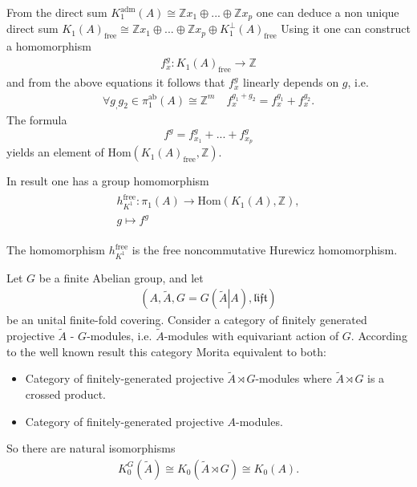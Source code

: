 \documentclass{beamer}
\theoremstyle{plain}
\newcommand{\Z}{\mathbb{Z}}                  %
\newcommand{\lift}{\mathfrak{lift}}
\newcommand{\Hom}{\mathrm{Hom}}
\newcommand{\bean}{\begin{eqnarray*}}
\newcommand{\eean}{\end{eqnarray*}}
\begin{document}
\begin{frame}
	From the direct sum $K^{\mathrm{adm}}_1\left( A\right)\cong \Z x_1 \oplus ...\oplus \Z x_p$ one can deduce  a non unique  direct sum $K_1\left( A\right)_{\mathrm{free}}\cong \Z x_1 \oplus ...\oplus \Z x_p\oplus K^\perp_1\left( A\right)_{\mathrm{free}}$
Using it  one can construct a homomorphism 
\bean
f^g_x: K_1\left( A\right)_{\mathrm{free}}\to\Z
\eean
and from the above equations it follows that $f^g_x$ linearly depends on $g$, i.e.
\bean
\forall g_, g_2\in \pi^{\mathrm{ab}}_1\left( A\right)\cong \Z^m\quad f^{g_1 + g_2}_x =  f^{g_1}_x+f^{g_2}_x.
\eean 
The formula
$$
f^g = f^g_{x_1} + ... + f^g_{x_p}
$$
yields an element of $\Hom\left(K_1\left( A\right)_{\mathrm{free}}, \Z \right)$.


\end{frame}
\begin{frame}
	In result one has a group homomorphism
	\bean
	\begin{split}
		h^{\mathrm{free}}_{K^1} : \pi_1\left(A \right) \to  \Hom\left(  K_1\left( A\right), \Z\right),\\
		g \mapsto f^g 
	\end{split}
	\eean
\begin{definition}\label{hurewicz_free_defn}
	The homomorphism  $h^{\mathrm{free}}_{K^1}$ is the \alert{free  noncommutative Hurewicz homomorphism}.
\end{definition}
\end{frame}
\begin{frame}
 Let $G$ be a finite Abelian group, and let
\bean 
\left(   A, \widetilde A, G = G\left(\left.\widetilde A \right| A \right)  ,  \lift \right)
\eean
be an unital finite-fold covering. Consider a category of finitely generated projective  $\widetilde A$ - $G$-modules, i.e. $\widetilde A$-modules with equivariant action of $G$. According to the well known result this category Morita equivalent to both:
\begin{itemize}
	\item Category of finitely-generated projective $\widetilde A\rtimes G$-modules where $\widetilde A\rtimes G$ is a crossed product.
		\item Category of finitely-generated projective $A$-modules.
\end{itemize}
So there are natural isomorphisms
\bean
K^{G}_0 \left(\widetilde A \right) \cong K_0 \left(\widetilde A \rtimes G\right) \cong K_0\left(A \right). 
\eean

\end{frame}
\end{document}
